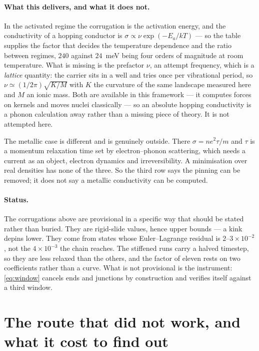 \documentclass[11pt]{article}
\begin{document}
\paragraph{What this delivers, and what it does not.} In the activated regime the corrugation is the
activation energy, and the conductivity of a hopping conductor is
$\sigma\propto\nu\exp(-E_a/kT)$ --- so the table supplies the factor that decides the temperature
dependence and the ratio between regimes, $240$ against $24$~meV being four orders of magnitude at
room temperature. What is missing is the prefactor $\nu$, an attempt frequency, which is a
\emph{lattice} quantity: the carrier sits in a well and tries once per vibrational period, so
$\nu\simeq(1/2\pi)\sqrt{K/M}$ with $K$ the curvature of the same landscape measured here and $M$ an
ionic mass. Both are available in this framework --- it computes forces on kernels and moves nuclei
classically --- so an absolute hopping conductivity is a phonon calculation away rather than a
missing piece of theory. It is not attempted here.

The metallic case is different and is genuinely outside. There $\sigma=ne^2\tau/m$ and $\tau$ is a
momentum relaxation time set by electron--phonon scattering, which needs a current as an object,
electron dynamics and irreversibility. A minimisation over real densities has none of the three. So
the third row says the pinning can be removed; it does not say a metallic conductivity can be
computed.

\paragraph{Status.} The corrugations above are provisional in a specific way that should be stated
rather than buried. They are rigid-slide values, hence upper bounds --- a kink depins lower. They
come from states whose Euler--Lagrange residual is $2$--$3\times10^{-2}$, not the $4\times10^{-3}$
the chain reaches. The stiffened runs carry a halved timestep, so they are less relaxed than the
others, and the factor of eleven rests on two coefficients rather than a curve. What is not
provisional is the instrument: \eqref{eq:window} cancels ends and junctions by construction and
verifies itself against a third window.

\section{The route that did not work, and what it cost to find out}\label{sec:mesh}
\end{document}
